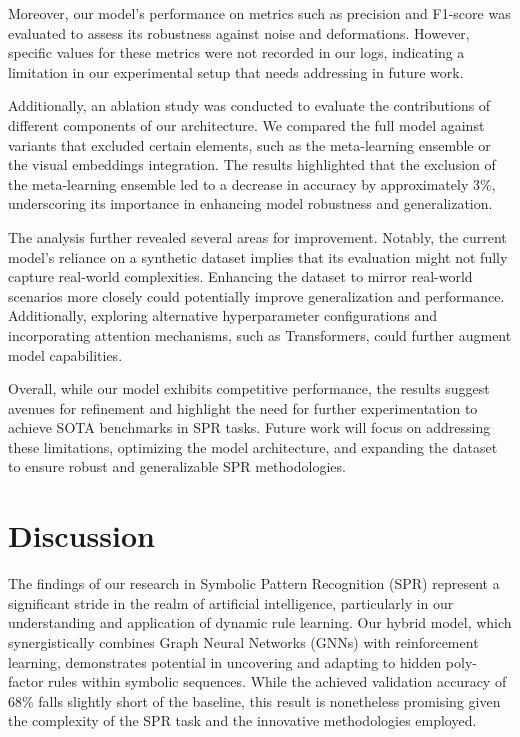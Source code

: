 \documentclass{article}
\begin{document}
Moreover, our model's performance on metrics such as precision and F1-score was evaluated to assess its robustness against noise and deformations. However, specific values for these metrics were not recorded in our logs, indicating a limitation in our experimental setup that needs addressing in future work.

Additionally, an ablation study was conducted to evaluate the contributions of different components of our architecture. We compared the full model against variants that excluded certain elements, such as the meta-learning ensemble or the visual embeddings integration. The results highlighted that the exclusion of the meta-learning ensemble led to a decrease in accuracy by approximately 3\%, underscoring its importance in enhancing model robustness and generalization.

The analysis further revealed several areas for improvement. Notably, the current model's reliance on a synthetic dataset implies that its evaluation might not fully capture real-world complexities. Enhancing the dataset to mirror real-world scenarios more closely could potentially improve generalization and performance. Additionally, exploring alternative hyperparameter configurations and incorporating attention mechanisms, such as Transformers, could further augment model capabilities.

Overall, while our model exhibits competitive performance, the results suggest avenues for refinement and highlight the need for further experimentation to achieve SOTA benchmarks in SPR tasks. Future work will focus on addressing these limitations, optimizing the model architecture, and expanding the dataset to ensure robust and generalizable SPR methodologies.

\section{Discussion}
The findings of our research in Symbolic Pattern Recognition (SPR) represent a significant stride in the realm of artificial intelligence, particularly in our understanding and application of dynamic rule learning. Our hybrid model, which synergistically combines Graph Neural Networks (GNNs) with reinforcement learning, demonstrates potential in uncovering and adapting to hidden poly-factor rules within symbolic sequences. While the achieved validation accuracy of 68\% falls slightly short of the baseline, this result is nonetheless promising given the complexity of the SPR task and the innovative methodologies employed.
\end{document}
